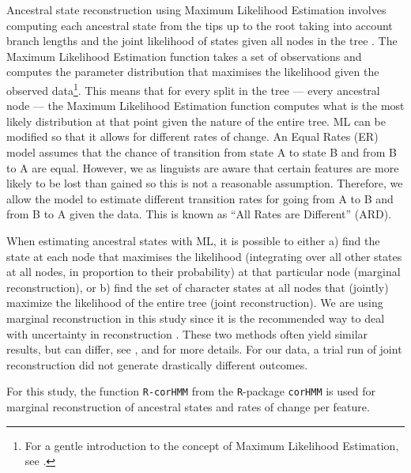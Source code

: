 \documentclass[12pt,letterpaper]{article}
\begin{document}
Ancestral state reconstruction using Maximum Likelihood Estimation involves computing each ancestral state from the tips up to the root taking into account branch lengths and the joint likelihood of states given all nodes in the tree \citep{wilks1938large, fisher1912absolute, pagel1994detecting, cunningham1998reconstructing}. The Maximum Likelihood Estimation function takes a set of observations and computes the parameter distribution that maximises the likelihood given the observed data\footnote{For a gentle introduction to the concept of Maximum Likelihood Estimation, see \citet{jonny_ML}.}. This means that for every split in the tree --- every ancestral node --- the Maximum Likelihood Estimation function computes what is the most likely distribution at that point given the nature of the entire tree. ML can be modified so that it allows for different rates of change. An Equal Rates (ER) model assumes that the chance of transition from state A to state B and from B to A are equal. However, we as linguists are aware that certain features are more likely to be lost than gained so this is not a reasonable assumption. Therefore, we allow the model to estimate different transition rates for going from A to B and from B to A given the data. This is known as ``All Rates are Different'' (ARD).

When estimating ancestral states with ML, it is possible to either a) find the state at each node that maximises the likelihood (integrating over all other states at all nodes, in proportion to their probability) at that particular node (marginal reconstruction), or b) find the set of character states at all nodes that (jointly) maximize the likelihood of the entire tree (joint reconstruction). We are using marginal reconstruction in this study since it is the recommended way to deal with uncertainty in reconstruction \citep{revell_2014}. These two methods often yield similar results, but can differ, see \citet[259-260]{felsenstein2004inferring},  \citet[121-126]{yang2006computational} and \citet[5]{joy2016ancestral} for more details. For our data, a trial run of joint reconstruction did not generate drastically different outcomes.

For this study, the function \texttt{R-corHMM} from the \texttt{R}-package \texttt{corHMM} \citep{R-corHMM} is used for marginal reconstruction of ancestral states and rates of change per feature. %
\end{document}
